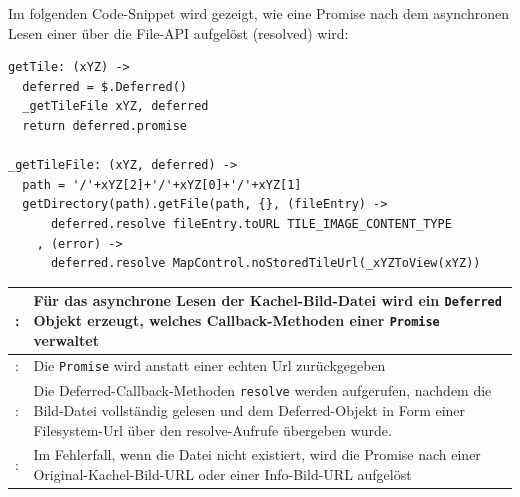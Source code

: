 Im folgenden Code-Snippet wird gezeigt, wie eine Promise nach dem asynchronen Lesen einer über die File-API
aufgelöst (resolved) wird:
\lstset{language=CoffeeScript}
\begin{lstlisting}[frame=single,xleftmargin=0pt]
getTile: (xYZ) ->
  deferred = $.Deferred()
  _getTileFile xYZ, deferred
  return deferred.promise  

_getTileFile: (xYZ, deferred) ->
  path = '/'+xYZ[2]+'/'+xYZ[0]+'/'+xYZ[1]
  getDirectory(path).getFile(path, {}, (fileEntry) ->
  	  deferred.resolve fileEntry.toURL TILE_IMAGE_CONTENT_TYPE
  	, (error) ->
  	  deferred.resolve MapControl.noStoredTileUrl(_xYZToView(xYZ))
\end{lstlisting}
\begin{table}[H]
  \begin{tabulary}{\columnwidth}{>{\raggedleft}m{.5cm} L}
  : & Für das asynchrone Lesen der Kachel-Bild-Datei wird ein \texttt{Deferred} Objekt erzeugt, welches Callback-Methoden einer \texttt{Promise} verwaltet \\ : & Die \texttt{Promise} wird anstatt einer echten Url zurückgegeben  \\ : & Die Deferred-Callback-Methoden \texttt{resolve} werden aufgerufen, nachdem die Bild-Datei vollständig gelesen und dem Deferred-Objekt in Form einer Filesystem-Url über den resolve-Aufrufe übergeben wurde.\\ : & Im Fehlerfall, wenn die Datei nicht existiert, wird die Promise nach einer Original-Kachel-Bild-URL oder einer Info-Bild-URL aufgelöst \\ \hline
  \end{tabulary}
\end{table}
